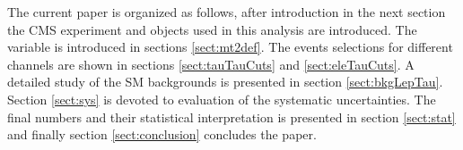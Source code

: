 The current paper is organized as follows, after introduction in the next section the CMS experiment  
and objects used in this analysis are introduced. The \mttwo variable is introduced in sections \ref{sect:mt2def}. 
The events selections for different channels are shown in sections \ref{sect:tauTauCuts} and \ref{sect:eleTauCuts}. 
A detailed study of the SM backgrounds is presented in section \ref{sect:bkgLepTau}. Section \ref{sect:sys} 
is devoted to evaluation of the systematic uncertainties. The final numbers and their statistical interpretation is presented in 
section \ref{sect:stat} and finally section \ref{sect:conclusion} concludes the paper.






